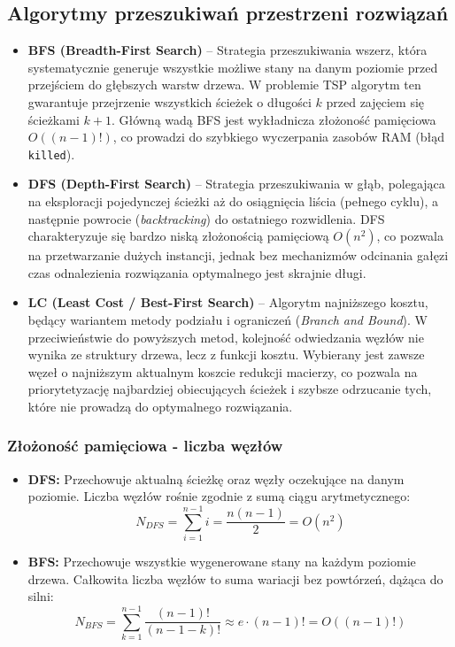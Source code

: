 \documentclass[12pt, a4paper]{article}
\begin{document}
\subsection{Algorytmy przeszukiwań przestrzeni rozwiązań}
\begin{itemize}
	\item \textbf{BFS (Breadth-First Search)} -- Strategia przeszukiwania wszerz, która systematycznie generuje wszystkie możliwe stany na danym poziomie przed przejściem do głębszych warstw drzewa. W problemie TSP algorytm ten gwarantuje przejrzenie wszystkich ścieżek o długości $k$ przed zajęciem się ścieżkami $k+1$. Główną wadą BFS jest wykładnicza złożoność pamięciowa $O((n-1)!)$, co prowadzi do szybkiego wyczerpania zasobów RAM (błąd \texttt{killed}).
	
	\item \textbf{DFS (Depth-First Search)} -- Strategia przeszukiwania w głąb, polegająca na eksploracji pojedynczej ścieżki aż do osiągnięcia liścia (pełnego cyklu), a następnie powrocie (\textit{backtracking}) do ostatniego rozwidlenia. DFS charakteryzuje się bardzo niską złożonością pamięciową $O(n^2)$, co pozwala na przetwarzanie dużych instancji, jednak bez mechanizmów odcinania gałęzi czas odnalezienia rozwiązania optymalnego jest skrajnie długi.
	
	\item \textbf{LC (Least Cost / Best-First Search)} -- Algorytm najniższego kosztu, będący wariantem metody podziału i ograniczeń (\textit{Branch and Bound}). W przeciwieństwie do powyższych metod, kolejność odwiedzania węzłów nie wynika ze struktury drzewa, lecz z funkcji kosztu. Wybierany jest zawsze węzeł o najniższym aktualnym koszcie redukcji macierzy, co pozwala na priorytetyzację najbardziej obiecujących ścieżek i szybsze odrzucanie tych, które nie prowadzą do optymalnego rozwiązania.
\end{itemize}



\subsubsection{Złożoność pamięciowa - liczba węzłów}

\begin{itemize}
	\item \textbf{DFS:} Przechowuje aktualną ścieżkę oraz węzły oczekujące na danym poziomie. Liczba węzłów rośnie zgodnie z sumą ciągu arytmetycznego:
	\begin{equation}
		N_{DFS} = \sum_{i=1}^{n-1} i = \frac{n(n-1)}{2} = O(n^2)
	\end{equation}
	
	\item \textbf{BFS:} Przechowuje wszystkie wygenerowane stany na każdym poziomie drzewa. Całkowita liczba węzłów to suma wariacji bez powtórzeń, dążąca do silni:
	\begin{equation}
		N_{BFS} = \sum_{k=1}^{n-1} \frac{(n-1)!}{(n-1-k)!} \approx e \cdot (n-1)! = O((n-1)!)
	\end{equation}
\end{itemize}
	
\end{document}
